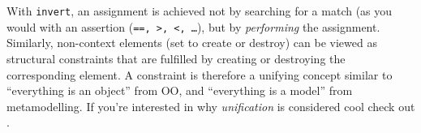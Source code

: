 With \texttt{invert}, an assignment is achieved not by searching for a match (as you would with an assertion (\texttt{==, >, <, \ldots}), but
by \emph{performing} the assignment. Similarly, non-context elements (set to create or destroy) can be viewed as structural constraints that are fulfilled by
creating or destroying the corresponding element.  A constraint is therefore a unifying concept similar to ``everything is an object'' from OO, and ``everything
is a model'' from metamodelling.  If you're interested in why \emph{unification} is considered cool check out \cite{BEZ05}.










